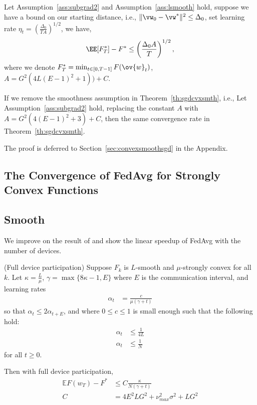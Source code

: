 \begin{theorem}
Let Assumption~\ref{ass:subgrad2} and Assumption~\ref{ass:lsmooth} hold, suppose we have a bound 
on our starting distance, i.e., $\|\vw_{0} - \vw^*\|^2 \leq \Delta_0$, set learning rate $\eta_t =  \left(\frac{\Delta_0}{ T A}\right)^{1/2}$, we have,
$$\EE[ F_T^*] - F^*  \leq \left(\frac{ \Delta_0 A }{T}\right)^{1/2},$$
where we denote $F^*_T = \min_{t \in [0, T-1]} F(\ov{w}_t)$, $A = G^2( 4L(E-1)^2 + 1)) + C$.
\label{th:sgdcvxsmth}
\end{theorem}

\begin{theorem}
If we remove the smoothness assumption in Theorem~\ref{th:sgdcvxsmth}, i.e., 
	Let Assumption~\ref{ass:subgrad2} hold, replacing the constant $A$ with $A=G^2 \left(4(E-1)^2 + 3\right) + C$, then the same convergence rate in Theorem~\ref{th:sgdcvxsmth}.
	\label{th:sgdcvxnonsmoth}
\end{theorem}
The proof is deferred to Section~\ref{sec:convexsmoothsgd} in the Appendix. 

\subsection{The Convergence of FedAvg for Strongly Convex Functions}

\subsection{Smooth}
We improve on the result of \cite{li2019convergence} and show the linear speedup of FedAvg with the number of devices. 

\begin{theorem}
	(Full device participation) Suppose $F_{k}$ is $L$-smooth and $\mu$-strongly
	convex for all $k$. Let $\kappa=\frac{L}{\mu}$, $\gamma=\max\{8\kappa-1,E\}$
	where $E$ is the communication interval, and learning rates 
	\begin{align*}
	\alpha_{t} & =\frac{c}{\mu(\gamma+t)}
	\end{align*}
	so that $\alpha_{t}\leq2\alpha_{t+E}$, and where $0\leq c\leq1$
	is small enough such that the following hold: 
	\begin{align*}
	\alpha_{t} & \leq\frac{1}{4L}\\
	\alpha_{t} & \leq\frac{1}{N}
	\end{align*}
	for all $t\geq0$. 
	
	Then with full device participation,
	\begin{align*}
	\mathbb{E}F(w_{T})-F^{\ast} & \leq C\frac{\kappa}{N(\gamma+t)}\\
	C & =4E^{2}LG^{2}+\nu_{max}^{2}\sigma^{2}+LG^{2}
	\end{align*}
	
\end{theorem}

